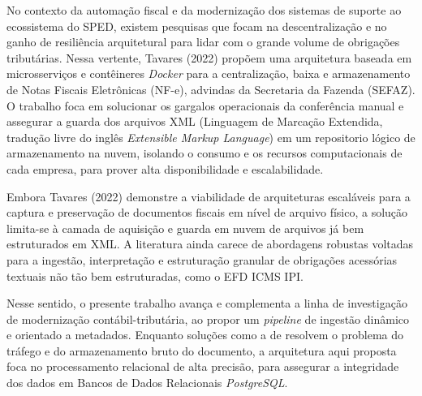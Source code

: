 No contexto da automação fiscal e da modernização dos sistemas de suporte ao
ecossistema do SPED, existem pesquisas que focam na descentralização e no ganho
de resiliência arquitetural para lidar com o grande volume de obrigações
tributárias. Nessa vertente, Tavares (2022) propõem uma
arquitetura baseada em microsserviços e contêineres \textit{Docker} para a
centralização, baixa e armazenamento de Notas Fiscais Eletrônicas (NF-e),
advindas da Secretaria da Fazenda (SEFAZ). O trabalho foca em solucionar os
gargalos operacionais da conferência manual e assegurar a guarda dos arquivos
XML (Linguagem de Marcação Extendida, tradução livre do inglês
\textit{Extensible Markup Language}) em um repositorio lógico de armazenamento
na nuvem, isolando o consumo e os recursos computacionais de cada empresa, para
prover alta disponibilidade e escalabilidade.

Embora Tavares (2022) demonstre a viabilidade de arquiteturas escaláveis para a
captura e preservação de documentos fiscais em nível de arquivo físico, a
solução limita-se à camada de aquisição e guarda em nuvem de arquivos já bem
estruturados em XML. A literatura ainda carece de abordagens robustas voltadas
para a ingestão, interpretação e estruturação granular de obrigações acessórias
textuais não tão bem estruturadas, como o EFD ICMS IPI. 

Nesse sentido, o presente trabalho avança e complementa a linha de investigação
de modernização contábil-tributária, ao propor um \textit{pipeline} de ingestão
dinâmico e orientado a metadados. Enquanto soluções como a de
\cite{tavares2022nfe} resolvem o problema do tráfego e do armazenamento bruto
do documento, a arquitetura aqui proposta foca no processamento relacional de
alta precisão, para assegurar a integridade dos dados em Bancos de Dados
Relacionais \textit{PostgreSQL}.